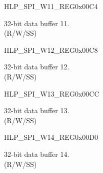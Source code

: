 \begin{register}{H}{LP\_SPI\_W11\_REG}{0x00C4}\label{regdesc:LPSPIW11REG}
%
\regnewline%
\begin{regdesc}\begin{reglist}
\label{fielddesc:LPSPIBUF11}\item [LP\_SPI\_BUF11] 32-bit data buffer 11.\\
(R/W/SS)
\end{reglist}\end{regdesc}
\end{register}


\begin{register}{H}{LP\_SPI\_W12\_REG}{0x00C8}\label{regdesc:LPSPIW12REG}
%
\regnewline%
\begin{regdesc}\begin{reglist}
\label{fielddesc:LPSPIBUF12}\item [LP\_SPI\_BUF12] 32-bit data buffer 12. \\
(R/W/SS)
\end{reglist}\end{regdesc}
\end{register}


\begin{register}{H}{LP\_SPI\_W13\_REG}{0x00CC}\label{regdesc:LPSPIW13REG}
%
\regnewline%
\begin{regdesc}\begin{reglist}
\label{fielddesc:LPSPIBUF13}\item [LP\_SPI\_BUF13] 32-bit data buffer 13.\\
(R/W/SS)
\end{reglist}\end{regdesc}
\end{register}


\begin{register}{H}{LP\_SPI\_W14\_REG}{0x00D0}\label{regdesc:LPSPIW14REG}
%
\regnewline%
\begin{regdesc}\begin{reglist}
\label{fielddesc:LPSPIBUF14}\item [LP\_SPI\_BUF14] 32-bit data buffer 14.\\
(R/W/SS)
\end{reglist}\end{regdesc}
\end{register}



